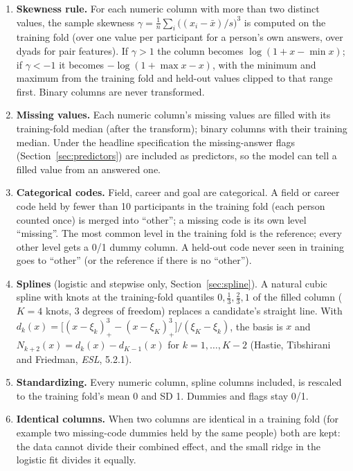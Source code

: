 \documentclass[11pt]{article}
\begin{document}
\begin{enumerate}
\item \textbf{Skewness rule.} For each numeric column with more than two distinct values, the sample skewness
$\gamma = \frac1n\sum_i \big((x_i-\bar x)/s\big)^3$ is computed on the training fold (over one value per participant
for a person's own answers, over dyads for pair features). If $\gamma > 1$ the column becomes
$\log(1 + x - \min x)$; if $\gamma < -1$ it becomes $-\log(1 + \max x - x)$, with the
minimum and maximum from the training fold and held-out values clipped to that range first. Binary columns are never
transformed.
\item \textbf{Missing values.} Each numeric column's missing values are filled with its training-fold median (after
the transform); binary columns with their training median. Under the headline specification the missing-answer
flags (Section~\ref{sec:predictors}) are included as predictors, so the model can tell a filled value from an answered
one.
\item \textbf{Categorical codes.} Field, career and goal are categorical. A field or career code held by fewer than
10 participants in the training fold (each person counted once) is merged into ``other''; a
missing code is its own level ``missing''. The most common level in the training fold is the reference; every other
level gets a 0/1 dummy column. A held-out code never seen in training goes to ``other'' (or the reference if there is
no ``other'').
\item \textbf{Splines} (logistic and stepwise only, Section~\ref{sec:spline}). A natural cubic spline with knots at
the training-fold quantiles $0, \tfrac13, \tfrac23, 1$ of the filled column ($K = 4$ knots, 3 degrees of freedom)
replaces a candidate's straight line. With $d_k(x) = \big[(x-\xi_k)_+^3 - (x-\xi_K)_+^3\big]/(\xi_K - \xi_k)$, the
basis is $x$ and $N_{k+2}(x) = d_k(x) - d_{K-1}(x)$ for $k = 1, \dots, K-2$ (Hastie, Tibshirani and Friedman,
\emph{ESL}, 5.2.1).
\item \textbf{Standardizing.} Every numeric column, spline columns included, is rescaled to the training fold's mean
0 and SD 1. Dummies and flags stay 0/1.
\item \textbf{Identical columns.} When two columns are identical in a training fold (for example two missing-code
dummies held by the same people) both are kept: the data cannot divide their combined effect, and the small ridge
in the logistic fit divides it equally.
\end{enumerate}
\end{document}
